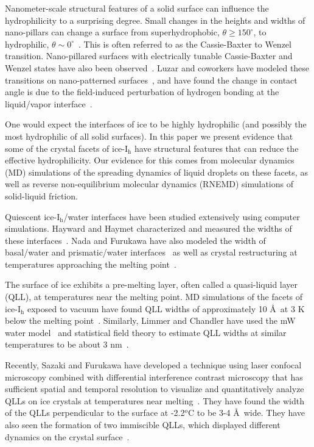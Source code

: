 Nanometer-scale structural features of a solid surface can influence
the hydrophilicity to a surprising degree.  Small changes in the
heights and widths of nano-pillars can change a surface from
superhydrophobic, $\theta \ge 150^{\circ}$, to hydrophilic, $\theta
\sim 0^{\circ}$~\cite{Koishi09}. This is often referred to as the
Cassie-Baxter to Wenzel transition.  Nano-pillared surfaces with
electrically tunable Cassie-Baxter and Wenzel states have also been
observed~\cite{Herbertson06,Dhindsa06,Verplanck07,Ahuja08,Manukyan11}.
Luzar and coworkers have modeled these transitions on nano-patterned
surfaces~\cite{Daub07,Daub10,Daub11,Ritchie12}, and have found the
change in contact angle is due to the field-induced perturbation of
hydrogen bonding at the liquid/vapor interface~\cite{Daub07}.

One would expect the interfaces of ice to be highly hydrophilic (and
possibly the most hydrophilic of all solid surfaces). In this paper we
present evidence that some of the crystal facets of ice-I$_\mathrm{h}$
have structural features that can reduce the effective hydrophilicity.
Our evidence for this comes from molecular dynamics (MD) simulations
of the spreading dynamics of liquid droplets on these facets, as well
as reverse non-equilibrium molecular dynamics (RNEMD) simulations of
solid-liquid friction.

Quiescent ice-I$_\mathrm{h}$/water interfaces have been studied
extensively using computer simulations. Hayward and Haymet
characterized and measured the widths of these
interfaces~\cite{Hayward01,Hayward02}.  Nada and Furukawa have also
modeled the width of basal/water and prismatic/water
interfaces~\cite{Nada95} as well as crystal restructuring at
temperatures approaching the melting point~\cite{Nada00}.

The surface of ice exhibits a pre-melting layer, often called a
quasi-liquid layer (QLL), at temperatures near the melting point.  MD
simulations of the facets of ice-I$_\mathrm{h}$ exposed to vacuum have
found QLL widths of approximately 10 \AA\ at 3 K below the melting
point~\cite{Conde08}. Similarly, Limmer and Chandler have used the mW
water model~\cite{Molinero09} and statistical field theory to estimate
QLL widths at similar temperatures to be about 3 nm~\cite{Limmer14}.

Recently, Sazaki and Furukawa have developed a technique using laser
confocal microscopy combined with differential interference contrast
microscopy that has sufficient spatial and temporal resolution to
visualize and quantitatively analyze QLLs on ice crystals at
temperatures near melting~\cite{Sazaki10}. They have found the width of
the QLLs perpendicular to the surface at -2.2$^{o}$C to be 3-4 \AA\
wide.  They have also seen the formation of two immiscible QLLs, which
displayed different dynamics on the crystal surface~\cite{Sazaki12}.


